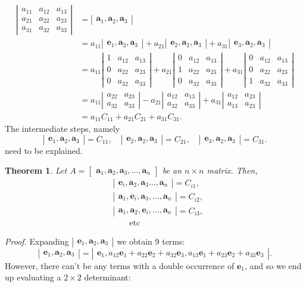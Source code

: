 \documentclass[12pt]{article}
\newcommand{\ba}{\mathbf{a}}
\newcommand{\be}{\mathbf{e}}
\newcommand{\bmat}[1]{\begin{bmatrix}#1\end{bmatrix}}
\newcommand{\vmat}[1]{\left|\begin{matrix}#1\end{matrix}\right|}
\newtheorem{theorem}{Theorem}
\begin{document}
\begin{align*}
\vmat{ a_{11}&a_{12}& a_{13} \\
    a_{21}&a_{22} & a_{23} \\
    a_{31}&a_{32} & a_{33}}
  &= \vmat{ \ba_1, \ba_2, \ba_3} \\
  &= a_{11} \vmat{\be_1, \ba_2,
    \ba_3} + a_{21} \vmat{\be_2, \ba_2, \ba_3} +a_{31}
  \vmat{\be_3,\ba_2,\ba_3} \\
  &= a_{11}
  \vmat{ 1&a_{12}& a_{13} \\
    0&a_{22} & a_{23} \\
    0&a_{32} & a_{33}} + a_{21}
  \vmat{ 0&a_{12}& a_{13} \\
    1&a_{22} & a_{23} \\
    0&a_{32} & a_{33}} + a_{31}
  \vmat{ 0&a_{12}& a_{13} \\
    0&a_{22} & a_{23} \\
    1&a_{32} & a_{33}}\\
  &= a_{11} \vmat{ a_{22} & a_{23} \\ a_{32} & a_{33}}
  - a_{21} \vmat{a_{12} & a_{13} \\ a_{32} & a_{33}} 
  + a_{31} \vmat{a_{12} & a_{23} \\ a_{13} &a_{23}} \\
  &= a_{11} C_{11} + a_{21} C_{21} + a_{31} C_{31}.
\end{align*}
The intermediate steps, namely
\[ \vmat{\be_1, \ba_2, \ba_3} = C_{11},\quad \vmat{\be_2, \ba_2, \ba_3}  = C_{21},\quad \vmat{\be_3, \ba_2, \ba_3} = C_{31}.\]
need to be explained.
\begin{theorem}
  \label{thm:cofactor}
  Let $A=\bmat{\ba_1,\ba_2,\ba_3,\ldots, \ba_n}$ be an $n\times n$ matrix.
  Then, 
  \begin{align*}
    &\vmat{\be_i,\ba_2,\ba_3 \ldots, \ba_n} = C_{i1},\\
    &\vmat{\ba_1,\be_i, \ba_3,\ldots, \ba_n} = C_{i2},\\
    &\vmat{\ba_1,\ba_2, \be_i,\ldots, \ba_n} = C_{i3},\\
    &\qquad \text{etc}    
  \end{align*}
\end{theorem}
\noindent\emph{Proof.} Expanding $\vmat{\be_1, \ba_2, \ba_3}$
we obtain 9 terms:
\[ \vmat{\be_1, \ba_2, \ba_3} = \vmat{\be_1, a_{12} \be_1 + a_{22}
  \be_2 + a_{32} \be_3, a_{13} \be_1 + a_{23} \be_2 + a_{33} \be_3}.\]
However, there can't be any terms with a double occurrence of $\be_1$,
and so we end up evaluating a $2\times 2$ determinant:
\end{document}
